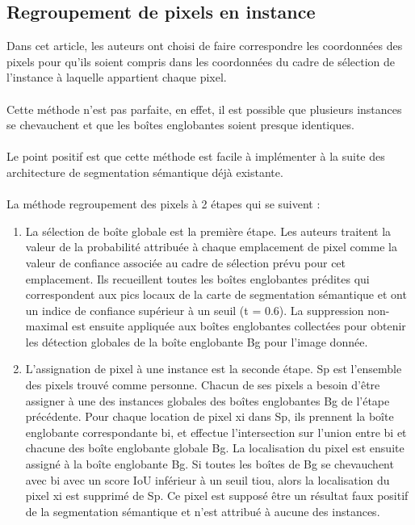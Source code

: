 \documentclass[11pt]{report}
\begin{document}
\subsection{Regroupement de pixels en instance}
Dans cet article, les auteurs ont choisi de faire correspondre les coordonnées des pixels pour qu'ils soient compris dans les coordonnées du cadre de sélection de l'instance à laquelle appartient chaque pixel.\\\\
Cette méthode n'est pas parfaite, en effet, il est possible que plusieurs instances se chevauchent et que les boîtes englobantes soient presque identiques.\\\\
Le point positif est que cette méthode est facile à implémenter à la suite des architecture de segmentation sémantique déjà existante.\\\\
La méthode regroupement des pixels à 2 étapes qui se suivent :
\begin{enumerate}
	\item La sélection de boîte globale est la première étape. Les auteurs traitent la valeur de la probabilité attribuée à chaque emplacement de pixel comme la valeur de confiance associée au cadre de sélection prévu pour cet emplacement. Ils recueillent toutes les boîtes englobantes prédites qui correspondent aux pics locaux de la carte de segmentation sémantique et ont un indice de confiance supérieur à un seuil (t = 0.6). La suppression non-maximal est ensuite appliquée aux boîtes englobantes collectées pour obtenir les détection globales de la boîte englobante Bg pour l'image donnée.
	\item L'assignation de pixel à une instance est la seconde étape. Sp est l'ensemble des pixels trouvé comme personne. Chacun de ses pixels a besoin d'être assigner à une des instances globales des boîtes englobantes Bg de l'étape précédente. Pour chaque location de pixel xi dans Sp, ils prennent la boîte englobante correspondante bi, et effectue l'intersection sur l'union entre bi et chacune des boîte englobante globale Bg. La localisation du pixel est ensuite assigné à la boîte englobante Bg. Si toutes les boîtes de Bg se chevauchent avec bi avec un score IoU inférieur à un seuil tiou, alors la localisation du pixel xi est supprimé de Sp. Ce pixel est supposé être un résultat faux positif de la segmentation sémantique et n'est attribué à aucune des instances.
\end{enumerate}
\end{document}
